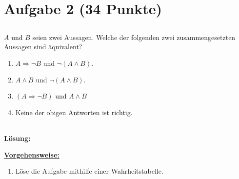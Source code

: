 \section*{Aufgabe 2 (34 Punkte)}
\vspace{0.4cm}
\subsection*{}
$ A $ und $ B $ seien zwei Aussagen. Welche der folgenden zwei zusammengesetzten Aussagen sind äquivalent? 
\renewcommand{\labelenumi}{(\alph{enumi})}
\begin{enumerate}
	\item $ A \Rightarrow   \neg B $ und $\neg (A \wedge B)$.
	\item $ A \wedge B $ und $\neg (A \wedge B)$.
	\item $ (A \Rightarrow \neg B) $ und $A \wedge B$
	\item Keine der obigen Antworten ist richtig.
\end{enumerate}
\ \\
\textbf{Lösung:}
\begin{mdframed}
\underline{\textbf{Vorgehensweise:}}
\renewcommand{\labelenumi}{\theenumi.}
\begin{enumerate}
\item Löse die Aufgabe mithilfe einer Wahrheitstabelle.
\end{enumerate}
\end{mdframed}

